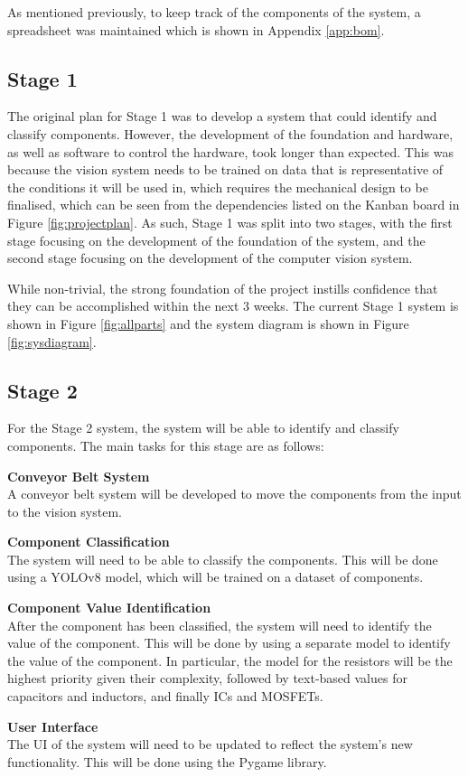 As mentioned previously, to keep track of the components of the system, a spreadsheet was maintained which is shown in Appendix \ref*{app:bom}.
\subsection{Stage 1}
The original plan for Stage 1 was to develop a system that could identify and classify components. However, the development 
of the foundation and hardware, as well as software to control the hardware, took longer than expected. This was because
the vision system needs to be trained on data that is representative of the conditions it will be used in, which 
requires the mechanical design to be finalised, which can be seen from the dependencies listed on the Kanban board in Figure \ref*{fig:projectplan}.
As such, Stage 1 was split into two stages, with the first stage focusing on the development of the foundation of the system, and the second stage focusing on the development of the computer vision system.

While non-trivial, the strong foundation of the project instills confidence that they can be accomplished within the next 3 weeks.
The current Stage 1 system is shown in Figure \ref*{fig:allparts} and the system diagram is shown in Figure \ref*{fig:sysdiagram}.

\subsection{Stage 2}
For the Stage 2 system, the system will be able to identify and classify components. 
The main tasks for this stage are as follows:
\begin{mylist}
    \item \textbf{Conveyor Belt System} \\
    A conveyor belt system will be developed to move the components from the input to the vision system.
    \item \textbf{Component Classification} \\
    The system will need to be able to classify the components. This will be done using a YOLOv8 model, which will be trained on a dataset of components.
    \item \textbf{Component Value Identification} \\
    After the component has been classified, the system will need to identify the value of the component. This will be done by using
    a separate model to identify the value of the component. In particular, the model for the resistors will be the highest
    priority given their complexity, followed by text-based values for capacitors and inductors, and finally ICs and MOSFETs.
    \item \textbf{User Interface} \\
    The UI of the system will need to be updated to reflect the system's new functionality. This will be done using the Pygame library\cite{pygamedoc}.
\end{mylist}

